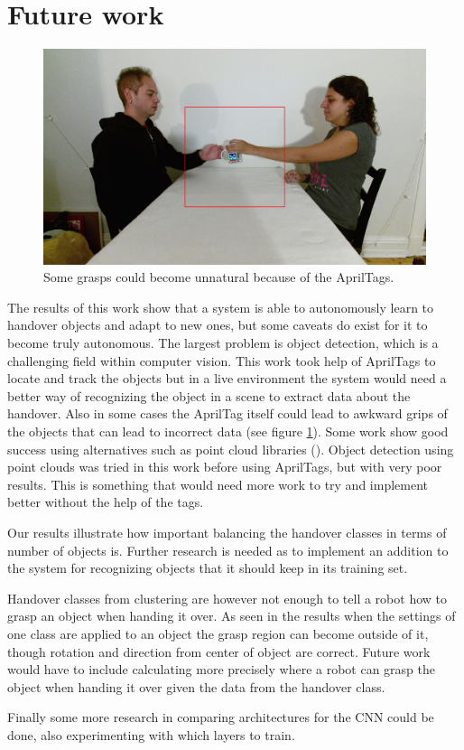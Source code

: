 \section{Future work}
\label{sec:future-work}

\begin{figure}
	\centering
	\includegraphics[width=\textwidth]{img/conclusion/awkward_handover_frame.jpg}
	\caption{Some grasps could become unnatural because of the AprilTags.}
	\label{fig:fw_handover_awkward}
\end{figure}

The results of this work show that a system is able to autonomously learn to handover objects and adapt to new ones, but some caveats do exist for it to become truly autonomous. The largest problem is object detection, which is a challenging field within computer vision. This work took help of AprilTags to locate and track the objects but in a live environment the system would need a better way of recognizing the object in a scene to extract data about the handover. Also in some cases the AprilTag itself could lead to awkward grips of the objects that can lead to incorrect data (see figure \ref{fig:fw_handover_awkward}). Some work show good success using alternatives such as point cloud libraries (\parencite{Chan2015a}). Object detection using point clouds was tried in this work before using AprilTags, but with very poor results. This is something that would need more work to try and implement better without the help of the tags.

Our results illustrate how important balancing the handover classes in terms of number of objects is. Further research is needed as to implement an addition to the system for recognizing objects that it should keep in its training set.

Handover classes from clustering are however not enough to tell a robot how to grasp an object when handing it over. As seen in the results when the settings of one class are applied to an object the grasp region can become outside of it, though rotation and direction from center of object are correct. Future work would have to include calculating more precisely where a robot can grasp the object when handing it over given the data from the handover class.

Finally some more research in comparing architectures for the CNN could be done, also experimenting with which layers to train.
